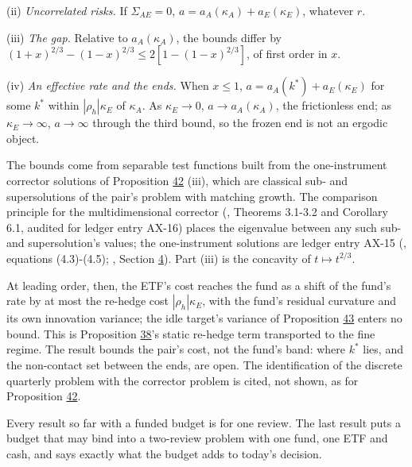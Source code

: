 \documentclass[11pt]{article}
\begin{document}
(ii) \emph{Uncorrelated risks.} If \(\Sigma_{AE}=0\), \(a=a_A(\kappa_A)+a_E(\kappa_E)\), whatever \(r\).

(iii) \emph{The gap.} Relative to \(a_A(\kappa_A)\), the bounds differ by
\((1+x)^{2/3}-(1-x)^{2/3}\leq2[1-(1-x)^{2/3}]\), of first order in \(x\).

(iv) \emph{An effective rate and the ends.} When \(x\leq1\), \(a=a_A(k^*)+a_E(\kappa_E)\)
for some \(k^*\) within \(|\rho_h|\kappa_E\) of \(\kappa_A\). As \(\kappa_E\to0\), \(a\to a_A(\kappa_A)\), the
frictionless end; as \(\kappa_E\to\infty\), \(a\to\infty\) through the third bound, so the
frozen end is not an ergodic object.

The bounds come from separable test functions built from the
one-instrument corrector solutions of Proposition \hyperref[res:Proposition-42]{42} (iii), which are
classical sub- and supersolutions of the pair's problem with matching
growth. The comparison principle for the multidimensional corrector
(\cite{possamai2015homogenization}, Theorems 3.1-3.2 and Corollary 6.1,
audited for ledger entry AX-16) places the eigenvalue between any such
sub- and supersolution's values; the one-instrument solutions are
ledger entry AX-15 (\cite{soner2013homogenization}, equations (4.3)-(4.5);
\cite{muhlekarbe2017primer}, Section \hyperref[sec:4]{4}). Part (iii) is the concavity of
\(t\mapsto t^{2/3}\).

At leading order, then, the ETF's cost reaches the fund as a shift of
the fund's rate by at most the re-hedge cost \(|\rho_h|\kappa_E\), with the
fund's residual curvature and its own innovation variance; the idle
target's variance of Proposition \hyperref[res:Proposition-43]{43} enters no bound. This is
Proposition \hyperref[res:Proposition-38]{38}'s static re-hedge term transported to the fine regime.
The result bounds the pair's cost, not the fund's band: where \(k^*\)
lies, and the non-contact set between the ends, are open. The
identification of the discrete quarterly problem with the corrector
problem is cited, not shown, as for Proposition \hyperref[res:Proposition-42]{42}.

Every result so far with a funded budget is for one review. The last
result puts a budget that may bind into a two-review problem with one
fund, one ETF and cash, and says exactly what the budget adds to
today's decision.
\end{document}
